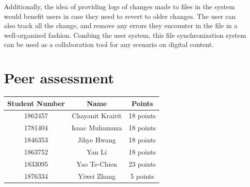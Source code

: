 \documentclass{article}
\begin{document}
Additionally, the idea of providing logs of changes made to files in the system would benefit users in case they need to revert to older changes. The user can also track all the change, and remove any errors they encounter in the file in a well-organized fashion. Combing the user system, this file synchronization system can be used as a collaboration tool for any scenario on digital content.

\section{Peer assessment}

\begin{center}
 \begin{tabular}{||c c c||} 
 \hline
 Student Number & Name & Points\\ [0.5ex] 
 \hline\hline
 1862457 & Chayanit Krairit & 18 points \\ 
 \hline
 1781404 & Isaac Muhumuza & 18 points \\
 \hline
 1846353 & Jihye Hwang & 18 points \\
 \hline
 1863752 & Yan Li & 18 points \\
 \hline
 1833095 & Yao Te-Chien & 23 points \\ 
 \hline
 1876334 & Yiwei Zhang & 5 points \\ 
 \hline
\end{tabular}
\end{center}
\end{document}
